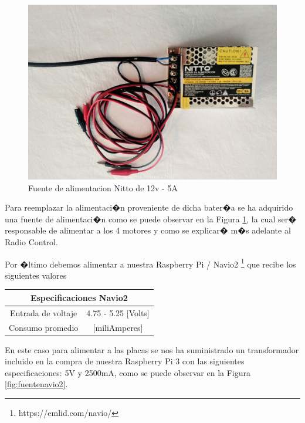 \begin{itemize}
	
	\begin{figure}[h!]
		\centering
		\includegraphics[width=0.6\linewidth, height=0.25\textheight]{Imagenes/fuente12A}
		\caption{Fuente de alimentacion Nitto de 12v - 5A}
		\label{fig:fuente12a}
	\end{figure}
	
	Para reemplazar la alimentaci�n proveniente de dicha bater�a se ha adquirido una fuente de alimentaci�n como se puede observar en la Figura \ref{fig:fuente12a}, la cual ser� responsable de alimentar a los 4 motores y como se explicar� m�s adelante al Radio Control.
	
	
	
	
	Por �ltimo debemos alimentar a nuestra Raspberry Pi / Navio2 \footnote{https://emlid.com/navio/} que recibe los siguientes valores 
	
	\begin{center}
		\begin{tabular}{|c|c|}
			\hline 
			\multicolumn{2}{|c|}{\textbf{Especificaciones Navio2}} \\ 
			\hline 
			Entrada de voltaje   & 4.75 - 5.25  [Volts] \\ 
			\hline 
			Consumo promedio & \< 150 [miliAmperes] \\ 
			\hline 
		\end{tabular} 
	\end{center}
	
	En este caso para alimentar a las placas se nos ha suministrado un transformador incluido en la compra de nuestra Raspberry Pi 3 con las siguientes especificaciones:
	5V y 2500mA, como se puede observar en la Figura \ref{fig:fuentenavio2}.
	

\end{itemize}
